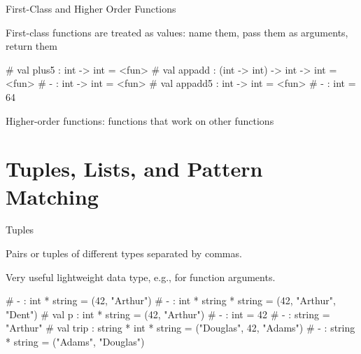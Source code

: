 \documentclass{plt}
\begin{document}
\begin{frame}[fragile]{First-Class and Higher Order Functions}

  First-class functions are treated as values: name them, pass them as arguments,
  return them

\begin{interactive}
# 
val plus5 : int -> int = <fun>
# 
val appadd : (int -> int) -> int -> int = <fun>
# 
- : int -> int = <fun>
# 
val appadd5 : int -> int = <fun>
# 
- : int = 64
\end{interactive}
Higher-order functions: functions that work on other functions


\end{frame}

\part{Tuples, Lists, and Pattern Matching}

\begin{frame}[fragile]{Tuples}

Pairs or tuples of different types separated by commas.

Very useful lightweight data type, e.g., for function arguments.

\begin{interactive}
# 
- : int * string = (42, "Arthur")
# 
- : int * string * string = (42, "Arthur", "Dent")
# 
val p : int * string = (42, "Arthur")
# 
- : int = 42
# 
- : string = "Arthur"
# 
val trip : string * int * string = ("Douglas", 42, "Adams")
# 
- : string * string = ("Adams", "Douglas")
\end{interactive}


\end{frame}
\end{document}
